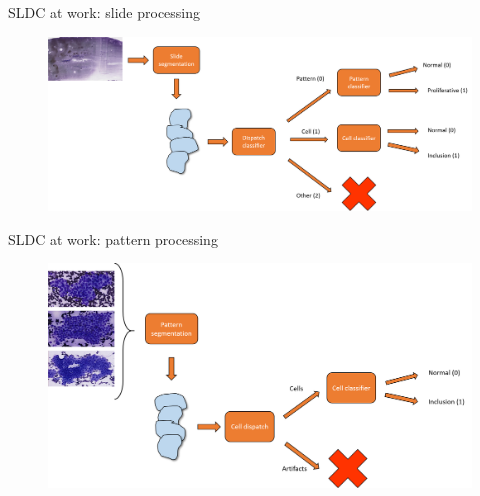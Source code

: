 \documentclass{beamer}
\begin{document}
\begin{frame}{SLDC at work: slide processing}
	\begin{figure}
		\includegraphics[scale=0.35]{images/thyroid_workflow_1.png}
	\end{figure}
\end{frame}


\begin{frame}{SLDC at work: pattern processing}
	\begin{figure}
		\includegraphics[scale=0.4]{images/thyroid_workflow_2.png}
	\end{figure}
\end{frame}
\end{document}
